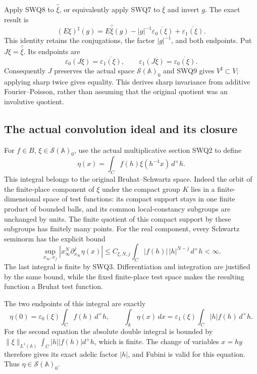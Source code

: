 Apply SWQ8 to $\widehat{\overline\xi}$, or equivalently apply
SWQ7 to $\overline\xi$ and invert $g$. The exact result is
\begin{equation}\tag{SWQ9}
 (E\xi)^{\sharp}(g)
 =E\widehat{\overline\xi}(g)
      -|g|^{-1}\overline{\varepsilon_0(\xi)}
      +\overline{\varepsilon_1(\xi)}.
\end{equation}
This identity retains the conjugations, the factor $|g|^{-1}$,
and both endpoints. Put $J\xi=\widehat{\overline\xi}$. Its
endpoints are
\begin{equation}\tag{SWQ10}
 \varepsilon_0(J\xi)=\overline{\varepsilon_1(\xi)},\qquad
 \varepsilon_1(J\xi)=\overline{\varepsilon_0(\xi)}.
\end{equation}
Consequently $J$ preserves the actual space $\mathcal S(\mathbb A)_0$
and SWQ9 gives $V^{\sharp}\subset V$; applying sharp twice gives
equality. This derives sharp invariance from additive Fourier--Poisson,
rather than assuming that the original quotient was an involutive
quotient.

\subsection{The actual convolution ideal and its closure}

For $f\in B$, $\xi\in\mathcal S(\mathbb A)_0$, use the actual
multiplicative section SWQ2 to define
\begin{equation}\tag{SWQ11}
 \eta(x)=\int_C f(h)\xi(h^{-1}x)\,d^{\times}h.
\end{equation}
This integral belongs to the original Bruhat--Schwartz space.
Indeed the orbit of the finite-place component of $\xi$ under
the compact group $K$ lies in a finite-dimensional space of test
functions: its compact support stays in one finite product of
bounded balls, and its common local-constancy subgroups are unchanged
by units. The finite quotient of this compact support by these
subgroups has finitely many points. For the real component, every
Schwartz seminorm has the explicit bound
\begin{equation}\tag{SWQ12}
 \sup_{x_\infty,x_f}
 |x_\infty^N\partial_{x_\infty}^j\eta(x)|
 \le C_{\xi,N,j}\int_C |f(h)|\,|h|^{N-j}\,d^{\times}h<\infty.
\end{equation}
The last integral is finite by SWQ3. Differentiation and integration
are justified by the same bound, while the fixed finite-place
test space makes the resulting function a Bruhat test function.

The two endpoints of this integral are exactly
\begin{equation}\tag{SWQ13}
 \eta(0)=\varepsilon_0(\xi)\int_C f(h)\,d^{\times}h,\qquad
 \int_{\mathbb A}\eta(x)\,dx
 =\varepsilon_1(\xi)\int_C |h|f(h)\,d^{\times}h.
\end{equation}
For the second equation the absolute double integral is bounded by
$\|\xi\|_{L^1(\mathbb A)}\int_C|h||f(h)|d^{\times}h$, which is
finite. The change of variables $x=hy$ therefore gives its exact
adelic factor $|h|$, and Fubini is valid for this equation.
Thus $\eta\in\mathcal S(\mathbb A)_0$.

